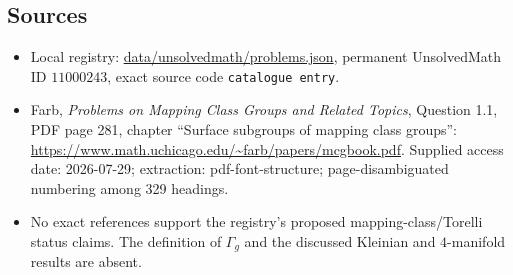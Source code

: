\documentclass[11pt]{article}
\begin{document}
\subsection{Sources}
\begin{itemize}
\item Local registry: \url{data/unsolvedmath/problems.json}, permanent UnsolvedMath ID $11000243$, exact source code \texttt{catalogue entry}.
\item Farb, \emph{Problems on Mapping Class Groups and Related Topics}, Question 1.1, PDF page 281, chapter ``Surface subgroups of mapping class groups'': \url{https://www.math.uchicago.edu/~farb/papers/mcgbook.pdf}. Supplied access date: 2026-07-29; extraction: pdf-font-structure; page-disambiguated numbering among 329 headings.
\item No exact references support the registry's proposed mapping-class/Torelli status claims. The definition of $\Gamma_g$ and the discussed Kleinian and $4$-manifold results are absent.
\end{itemize}
\end{document}
